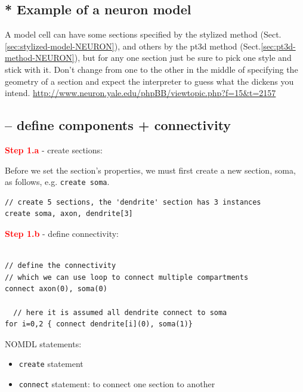 \subsection{* Example of a neuron model}

A model cell can have some sections specified by the stylized method
(Sect.\ref{sec:stylized-model-NEURON}), and others by the pt3d method
(Sect.\ref{sec:pt3d-method-NEURON}), but for any one section just be sure to
pick one style and stick with it.  Don't change from one to the other in the middle of specifying the geometry of a section and
expect the interpreter to guess what the dickens you intend.
\url{http://www.neuron.yale.edu/phpBB/viewtopic.php?f=15&t=2157}

\subsection{-- define components + connectivity}

\textcolor{red}{\bf Step 1.a } - create sections:

Before we set the section's properties, we must first create a new section,
soma, as follows, e.g. \verb!create soma!.
\begin{verbatim}
// create 5 sections, the 'dendrite' section has 3 instances
create soma, axon, dendrite[3]

\end{verbatim}


\textcolor{red}{\bf Step 1.b } - define connectivity:
 
\begin{verbatim}

// define the connectivity
// which we can use loop to connect multiple compartments
connect axon(0), soma(0)

  // here it is assumed all dendrite connect to soma
for i=0,2 { connect dendrite[i](0), soma(1)}

\end{verbatim}

NOMDL statements:
\begin{itemize}
 
  \item \verb!create! statement
  
  \item  \verb!connect! statement: to connect one section to another


\end{itemize}

